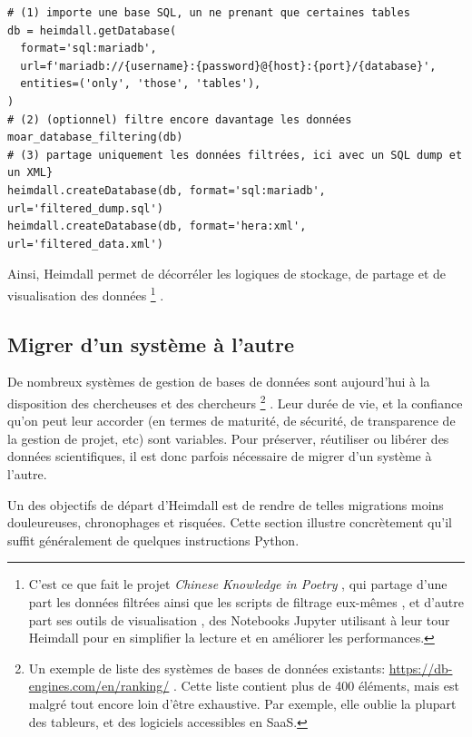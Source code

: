 \documentclass[final,fra]{anthology-ch}         %
\begin{document}
\begin{verbatim}
# (1) importe une base SQL, un ne prenant que certaines tables
db = heimdall.getDatabase(
  format='sql:mariadb',
  url=f'mariadb://{username}:{password}@{host}:{port}/{database}',
  entities=('only', 'those', 'tables'),
)
# (2) (optionnel) filtre encore davantage les données
moar_database_filtering(db)
# (3) partage uniquement les données filtrées, ici avec un SQL dump et un XML}
heimdall.createDatabase(db, format='sql:mariadb', url='filtered_dump.sql')
heimdall.createDatabase(db, format='hera:xml', url='filtered_data.xml')
\end{verbatim}

Ainsi, Heimdall permet de décorréler les logiques de stockage, de partage et de visualisation des données%
    \footnote{C'est ce que fait le projet \emph{Chinese Knowledge in Poetry} \autocite{ckp}, qui partage d'une part les données filtrées ainsi que les scripts de filtrage eux-mêmes \autocite{ckp:knowledge-base}, et d'autre part ses outils de visualisation \autocite{ckp:tools}, des Notebooks Jupyter utilisant à leur tour Heimdall pour en simplifier la lecture et en améliorer les performances.}%
.

\subsection{Migrer d'un système à l'autre}\label{migrer-dun-systuxe8me-uxe0-lautre}

De nombreux systèmes de gestion de bases de données sont aujourd'hui à la disposition des chercheuses et des chercheurs%
    \footnote{Un exemple de liste des systèmes de bases de données existants: \url{https://db-engines.com/en/ranking/} . Cette liste contient plus de 400 éléments, mais est malgré tout encore loin d'être exhaustive. Par exemple, elle oublie la plupart des tableurs, et des logiciels accessibles en SaaS.}%
. Leur durée de vie, et la confiance qu'on peut leur accorder (en termes de maturité, de sécurité, de transparence de la gestion de projet, etc) sont variables. Pour préserver, réutiliser ou libérer des données scientifiques, il est donc parfois nécessaire de migrer d'un système à l'autre.

Un des objectifs de départ d'Heimdall est de rendre de telles migrations moins douleureuses, chronophages et risquées. Cette section illustre concrètement qu'il suffit généralement de quelques instructions Python.
\end{document}
